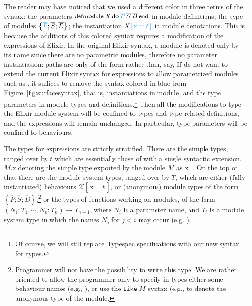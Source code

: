 \documentclass[a4paper,10pt]{article}
\DeclareMathOperator{\kwend}{\textsf{end}}
\DeclareMathOperator{\kwdo}{\textsf{do}}
\DeclareMathOperator{\kwdefm}{\textsf{defmodule}}
\newcommand{\tx}{\textrm{x}}
\begin{document}
The reader may have noticed that we used a different color in three terms of the syntax: the parameters $\kwdefm X \kwdo \textcolor{Cerulean}{\overline{P}}\, \overline{S}\, \overline{B} \kwend$ in module definitions; the type of modules $\left\{\textcolor{Cerulean}{\overline{P}};\overline{S};\overline{D}\right\}$; the instantiation $X\textcolor{Cerulean}{[\,\overline{\tx=t}\,]}$ in module denotations. This is because the additions of this colored syntax requires a modification of the expressions of Elixir. In the original Elixir syntax, a module is denoted only by its name since there are no parametric modules, therefore no parameter instantiation: paths are only of the form  rather than, say,  If do not want to extend the current Elixir syntax for expressions to allow parametrized modules such as , it suffices to remove the syntax colored in blue  from Figure~\ref{fig:surfacesyntax}, that is, instantiations in module, and the type parameters in module types and definitions.\footnote{Of course, we will still replace Typespec specifications with our new syntax for types.} Then all the modifications to type the Elixir module system will be confined to types and type-related definitions, and the expressions will remain unchanged. In particular, type parameters will be confined to behaviours. 

The types for expressions are strictly stratified. There are the simple types, ranged over by $t$ which are essentially  those of \cite{CDV24} with a single syntactic extension, $M.\tx$ denoting the simple type exported by the module $M$ as $\tx$. . On the top of that there are the module system types, ranged over by $T$, which are either (fully instantiated) behaviours $\mathcal X[\,\overline{\tx= t}\,]$, or (anonymous) module types of the form $\left\{{\overline{P}};\overline{S};\overline{D}\right\}$,\footnote{
  Programmer will not have the possibility to write this type. We are rather oriented to allow the programmer only to specify in types either some behaviour names (e.g., ), or use the \texttt{Like$\;M$} syntax (e.g.,  to denote the anonymous type of the  module.} or  the types of functions working on modules, of the form $(N_1{:} T_1,\cdots, N_n{:}T_n) \to T_{n+1}$, where $N_i$ is a parameter name, and $T_i$ is a module system type in which the names $N_j$ for $j<i$ may occur (e.g. ).
\end{document}

